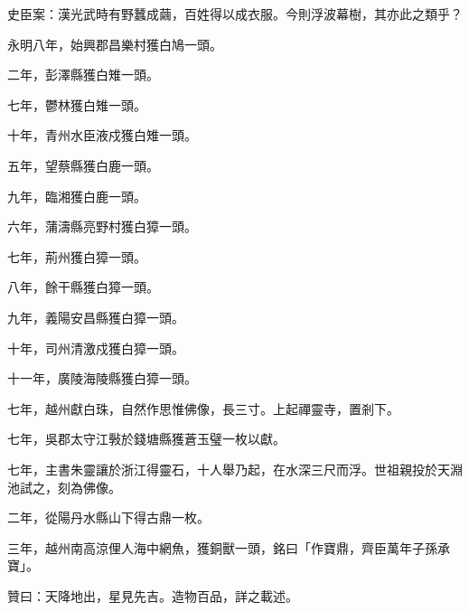 \begin{pinyinscope}
 史臣案：漢光武時有野蠶成繭，百姓得以成衣服。今則浮波幕樹，其亦此之類乎？



 永明八年，始興郡昌樂村獲白鳩一頭。



 二年，彭澤縣獲白雉一頭。



 七年，鬱林獲白雉一頭。



 十年，青州水臣液戍獲白雉一頭。



 五年，望蔡縣獲白鹿一頭。



 九年，臨湘獲白鹿一頭。



 六年，蒲濤縣亮野村獲白獐一頭。



 七年，荊州獲白獐一頭。



 八年，餘干縣獲白獐一頭。



 九年，義陽安昌縣獲白獐一頭。



 十年，司州清激戍獲白獐一頭。



 十一年，廣陵海陵縣獲白獐一頭。



 七年，越州獻白珠，自然作思惟佛像，長三寸。上起禪靈寺，置剎下。



 七年，吳郡太守江斅於錢塘縣獲蒼玉璧一枚以獻。



 七年，主書朱靈讓於浙江得靈石，十人舉乃起，在水深三尺而浮。世祖親投於天淵池試之，刻為佛像。



 二年，從陽丹水縣山下得古鼎一枚。



 三年，越州南高涼俚人海中網魚，獲銅獸一頭，銘曰「作寶鼎，齊臣萬年子孫承寶」。



 贊曰：天降地出，星見先吉。造物百品，詳之載述。



\end{pinyinscope}